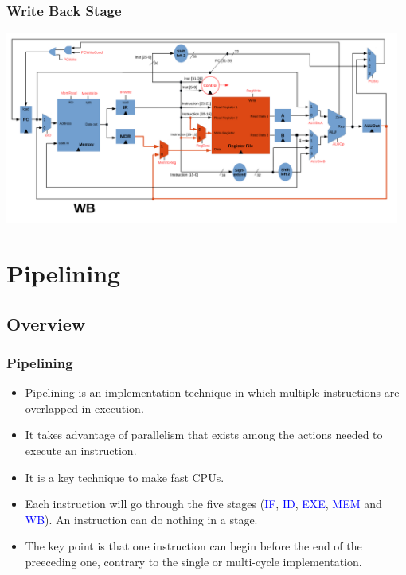 \documentclass{beamer}
\begin{document}
\begin{frame}%
\frametitle{Write Back Stage}

\begin{center}
\hspace*{-1cm}\includegraphics[width=13cm]{complete_multi_cycle_stage5.pdf}
\end{center}

\end{frame}


\section{Pipelining}

\subsection{Overview}

\begin{frame}%
\frametitle{Pipelining}

\begin{itemize}

\item Pipelining is an implementation technique in which multiple instructions are overlapped in execution.

  \vspace{0.2cm}

\item It takes advantage of parallelism that exists among the actions needed to execute an instruction.

  \vspace{0.2cm}

\item It is a key technique to make fast CPUs.

  \vspace{0.2cm}

\item Each instruction will go through the five stages (\textcolor{blue}{IF}, \textcolor{blue}{ID}, \textcolor{blue}{EXE},
  \textcolor{blue}{MEM} and \textcolor{blue}{WB}). An instruction can do nothing in a stage.

  \vspace{0.2cm}

\item The key point is that one instruction can begin before the end of the preeceding one, contrary to the single or multi-cycle
  implementation.

\end{itemize}

\end{frame}
\end{document}
